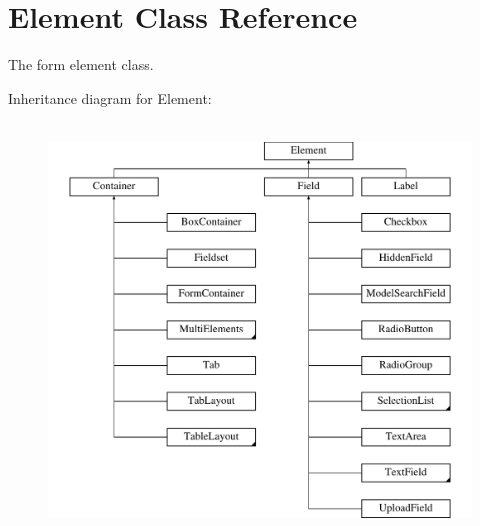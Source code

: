 \hypertarget{class_element}{
\section{Element Class Reference}
\label{class_element}
}


The form element class.  


Inheritance diagram for Element:\begin{figure}[H]
\begin{center}
\leavevmode
\includegraphics[height=11.000000cm]{class_element}
\end{center}
\end{figure}
